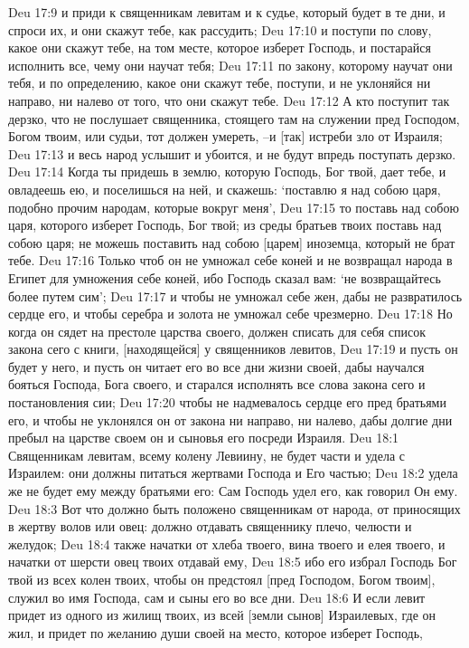 Deu 17:9  и приди к священникам левитам и к судье, который будет в те дни, и спроси их, и они скажут тебе, как рассудить;
Deu 17:10  и поступи по слову, какое они скажут тебе, на том месте, которое изберет Господь, и постарайся исполнить все, чему они научат тебя;
Deu 17:11  по закону, которому научат они тебя, и по определению, какое они скажут тебе, поступи, и не уклоняйся ни направо, ни налево от того, что они скажут тебе.
Deu 17:12  А кто поступит так дерзко, что не послушает священника, стоящего там на служении пред Господом, Богом твоим, или судьи, тот должен умереть, --и [так] истреби зло от Израиля;
Deu 17:13  и весь народ услышит и убоится, и не будут впредь поступать дерзко.
Deu 17:14  Когда ты придешь в землю, которую Господь, Бог твой, дает тебе, и овладеешь ею, и поселишься на ней, и скажешь: `поставлю я над собою царя, подобно прочим народам, которые вокруг меня',
Deu 17:15  то поставь над собою царя, которого изберет Господь, Бог твой; из среды братьев твоих поставь над собою царя; не можешь поставить над собою [царем] иноземца, который не брат тебе.
Deu 17:16  Только чтоб он не умножал себе коней и не возвращал народа в Египет для умножения себе коней, ибо Господь сказал вам: `не возвращайтесь более путем сим';
Deu 17:17  и чтобы не умножал себе жен, дабы не развратилось сердце его, и чтобы серебра и золота не умножал себе чрезмерно.
Deu 17:18  Но когда он сядет на престоле царства своего, должен списать для себя список закона сего с книги, [находящейся] у священников левитов,
Deu 17:19  и пусть он будет у него, и пусть он читает его во все дни жизни своей, дабы научался бояться Господа, Бога своего, и старался исполнять все слова закона сего и постановления сии;
Deu 17:20  чтобы не надмевалось сердце его пред братьями его, и чтобы не уклонялся он от закона ни направо, ни налево, дабы долгие дни пребыл на царстве своем он и сыновья его посреди Израиля.
Deu 18:1  Священникам левитам, всему колену Левиину, не будет части и удела с Израилем: они должны питаться жертвами Господа и Его частью;
Deu 18:2  удела же не будет ему между братьями его: Сам Господь удел его, как говорил Он ему.
Deu 18:3  Вот что должно быть положено священникам от народа, от приносящих в жертву волов или овец: должно отдавать священнику плечо, челюсти и желудок;
Deu 18:4  также начатки от хлеба твоего, вина твоего и елея твоего, и начатки от шерсти овец твоих отдавай ему,
Deu 18:5  ибо его избрал Господь Бог твой из всех колен твоих, чтобы он предстоял [пред Господом, Богом твоим], служил во имя Господа, сам и сыны его во все дни.
Deu 18:6  И если левит придет из одного из жилищ твоих, из всей [земли сынов] Израилевых, где он жил, и придет по желанию души своей на место, которое изберет Господь,

